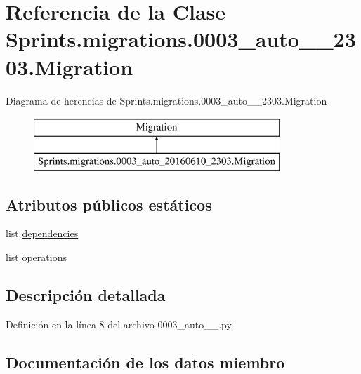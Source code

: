 \hypertarget{class_sprints_1_1migrations_1_10003__auto__20160610__2303_1_1_migration}{}\section{Referencia de la Clase Sprints.\+migrations.0003\+\_\+auto\+\_\+\_\+2303.Migration}
\label{class_sprints_1_1migrations_1_10003__auto__20160610__2303_1_1_migration}
Diagrama de herencias de Sprints.\+migrations.0003\+\_\+auto\+\_\+\_\+2303.Migration\begin{figure}[H]
\begin{center}
\leavevmode
\includegraphics[height=2.000000cm]{class_sprints_1_1migrations_1_10003__auto__20160610__2303_1_1_migration}
\end{center}
\end{figure}
\subsection*{Atributos públicos estáticos}
\begin{DoxyCompactItemize}
\item 
list \hyperlink{class_sprints_1_1migrations_1_10003__auto__20160610__2303_1_1_migration_a8de964b6617ae571e89361bb47f0997e}{dependencies}
\item 
list \hyperlink{class_sprints_1_1migrations_1_10003__auto__20160610__2303_1_1_migration_aabe88073bde65b06ab92e76be88350f0}{operations}
\end{DoxyCompactItemize}


\subsection{Descripción detallada}


Definición en la línea 8 del archivo 0003\+\_\+auto\+\_\+\_.\+py.



\subsection{Documentación de los datos miembro}
